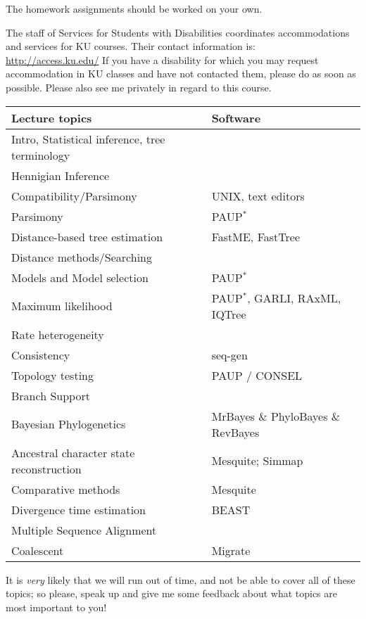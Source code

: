 \documentclass[11pt]{article}
\begin{document}
The homework assignments should be worked on your own. 

\newpage
{}\par
The staff of Services for Students with Disabilities coordinates accommodations and services for KU courses. Their contact information is:\\ 
\url{http://access.ku.edu/}
If you have a disability for which you may request accommodation in KU classes and have not contacted them, please do as soon as possible. 
Please also see me privately in regard to this course. 
 
\begin{table}[h]
\begin{center}
\begin{tabular}{|l|p{1.9in}|}
\hline
 {\bf Lecture topics} & {\bf Software} \\
\hline
Intro,  Statistical inference, tree terminology & \\
\hline
Hennigian Inference & \\
\hline
Compatibility/Parsimony & UNIX, text editors \\
\hline
Parsimony & PAUP$^\ast$\\
\hline
Distance-based tree estimation & FastME, FastTree \\
\hline
Distance methods/Searching & \\
\hline
Models and Model selection & PAUP$^\ast$\\
\hline
Maximum likelihood & PAUP$^\ast$, GARLI, RAxML, IQTree \\
\hline
Rate heterogeneity & \\
\hline 
Consistency & seq-gen \\
\hline
Topology testing & PAUP / CONSEL \\
\hline
Branch Support &  \\
\hline
Bayesian Phylogenetics & MrBayes \& PhyloBayes \& RevBayes\\
\hline
Ancestral character state reconstruction & Mesquite; Simmap \\
\hline
Comparative methods & Mesquite \\
\hline
Divergence time estimation &  BEAST \\
\hline
Multiple Sequence Alignment & \\
\hline
Coalescent & Migrate\\
\hline
\end{tabular}
\end{center}
\label{default}
\end{table}%

It is {\em very} likely that we will run out of time, and not be able to cover all of these topics; so please, speak up and give me some feedback about what topics are most important to you!
\end{document}
